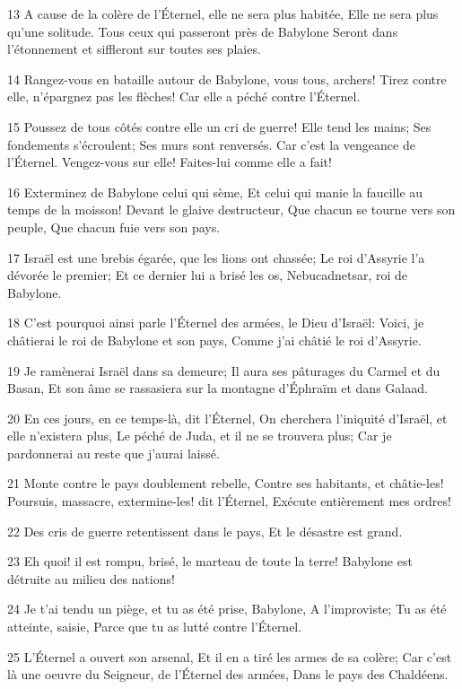 \par 13 A cause de la colère de l'Éternel, elle ne sera plus habitée, Elle ne sera plus qu'une solitude. Tous ceux qui passeront près de Babylone Seront dans l'étonnement et siffleront sur toutes ses plaies.
\par 14 Rangez-vous en bataille autour de Babylone, vous tous, archers! Tirez contre elle, n'épargnez pas les flèches! Car elle a péché contre l'Éternel.
\par 15 Poussez de tous côtés contre elle un cri de guerre! Elle tend les mains; Ses fondements s'écroulent; Ses murs sont renversés. Car c'est la vengeance de l'Éternel. Vengez-vous sur elle! Faites-lui comme elle a fait!
\par 16 Exterminez de Babylone celui qui sème, Et celui qui manie la faucille au temps de la moisson! Devant le glaive destructeur, Que chacun se tourne vers son peuple, Que chacun fuie vers son pays.
\par 17 Israël est une brebis égarée, que les lions ont chassée; Le roi d'Assyrie l'a dévorée le premier; Et ce dernier lui a brisé les os, Nebucadnetsar, roi de Babylone.
\par 18 C'est pourquoi ainsi parle l'Éternel des armées, le Dieu d'Israël: Voici, je châtierai le roi de Babylone et son pays, Comme j'ai châtié le roi d'Assyrie.
\par 19 Je ramènerai Israël dans sa demeure; Il aura ses pâturages du Carmel et du Basan, Et son âme se rassasiera sur la montagne d'Éphraïm et dans Galaad.
\par 20 En ces jours, en ce temps-là, dit l'Éternel, On cherchera l'iniquité d'Israël, et elle n'existera plus, Le péché de Juda, et il ne se trouvera plus; Car je pardonnerai au reste que j'aurai laissé.
\par 21 Monte contre le pays doublement rebelle, Contre ses habitants, et châtie-les! Poursuis, massacre, extermine-les! dit l'Éternel, Exécute entièrement mes ordres!
\par 22 Des cris de guerre retentissent dans le pays, Et le désastre est grand.
\par 23 Eh quoi! il est rompu, brisé, le marteau de toute la terre! Babylone est détruite au milieu des nations!
\par 24 Je t'ai tendu un piège, et tu as été prise, Babylone, A l'improviste; Tu as été atteinte, saisie, Parce que tu as lutté contre l'Éternel.
\par 25 L'Éternel a ouvert son arsenal, Et il en a tiré les armes de sa colère; Car c'est là une oeuvre du Seigneur, de l'Éternel des armées, Dans le pays des Chaldéens.
